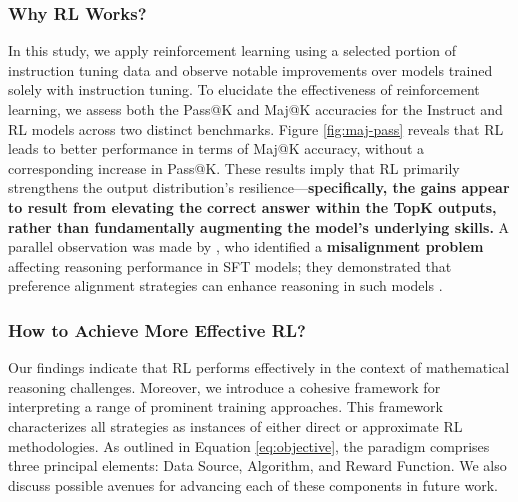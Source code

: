 \begin{itemize}[topsep=0pt]
\begin{itemize}[topsep=0pt]
\subsubsection{Why RL Works?} In this study, we apply reinforcement learning using a selected portion of instruction tuning data and observe notable improvements over models trained solely with instruction tuning. To elucidate the effectiveness of reinforcement learning, we assess both the Pass@K and Maj@K accuracies for the Instruct and RL models across two distinct benchmarks. Figure \ref{fig:maj-pass} reveals that RL leads to better performance in terms of Maj@K accuracy, without a corresponding increase in Pass@K. These results imply that RL primarily strengthens the output distribution's resilience—\textbf{specifically, the gains appear to result from elevating the correct answer within the TopK outputs, rather than fundamentally augmenting the model’s underlying skills.} A parallel observation was made by \citep{wang2023making}, who identified a \textbf{misalignment problem} affecting reasoning performance in SFT models; they demonstrated that preference alignment strategies can enhance reasoning in such models \citep{yuan2023rrhf,song2023preference,wang2023making}.

\subsubsection{How to Achieve More Effective RL?}
\label{sec:effec_rl}
Our findings indicate that RL performs effectively in the context of mathematical reasoning challenges. Moreover, we introduce a cohesive framework for interpreting a range of prominent training approaches. This framework characterizes all strategies as instances of either direct or approximate RL methodologies. As outlined in Equation \ref{eq:objective}, the paradigm comprises three principal elements: Data Source, Algorithm, and Reward Function. We also discuss possible avenues for advancing each of these components in future work.


\end{itemize}
\end{itemize}

